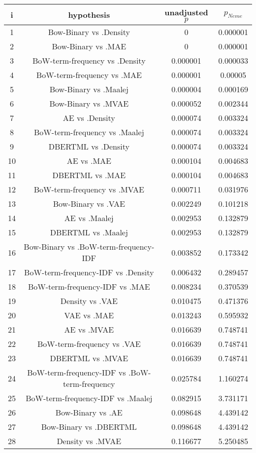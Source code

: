 \documentclass[a4paper,10pt]{article}
\begin{document}
\begin{landscape}
\begin{table}[!htp]
\centering\scriptsize
\begin{tabular}{cccc}
i&hypothesis&unadjusted $p$&$p_{Neme}$\\
\hline1&Bow-Binary vs .Density&0&0.000001\\
2&Bow-Binary vs .MAE&0&0.000001\\
3&BoW-term-frequency vs .Density&0.000001&0.000033\\
4&BoW-term-frequency vs .MAE&0.000001&0.00005\\
5&Bow-Binary vs .Maalej&0.000004&0.000169\\
6&Bow-Binary vs .MVAE&0.000052&0.002344\\
7&AE vs .Density&0.000074&0.003324\\
8&BoW-term-frequency vs .Maalej&0.000074&0.003324\\
9&DBERTML vs .Density&0.000074&0.003324\\
10&AE vs .MAE&0.000104&0.004683\\
11&DBERTML vs .MAE&0.000104&0.004683\\
12&BoW-term-frequency vs .MVAE&0.000711&0.031976\\
13&Bow-Binary vs .VAE&0.002249&0.101218\\
14&AE vs .Maalej&0.002953&0.132879\\
15&DBERTML vs .Maalej&0.002953&0.132879\\
16&Bow-Binary vs .BoW-term-frequency-IDF&0.003852&0.173342\\
17&BoW-term-frequency-IDF vs .Density&0.006432&0.289457\\
18&BoW-term-frequency-IDF vs .MAE&0.008234&0.370539\\
19&Density vs .VAE&0.010475&0.471376\\
20&VAE vs .MAE&0.013243&0.595932\\
21&AE vs .MVAE&0.016639&0.748741\\
22&BoW-term-frequency vs .VAE&0.016639&0.748741\\
23&DBERTML vs .MVAE&0.016639&0.748741\\
24&BoW-term-frequency-IDF vs .BoW-term-frequency&0.025784&1.160274\\
25&BoW-term-frequency-IDF vs .Maalej&0.082915&3.731171\\
26&Bow-Binary vs .AE&0.098648&4.439142\\
27&Bow-Binary vs .DBERTML&0.098648&4.439142\\
28&Density vs .MVAE&0.116677&5.250485\\

\end{tabular}
\end{table}
\end{landscape}
\end{document}
